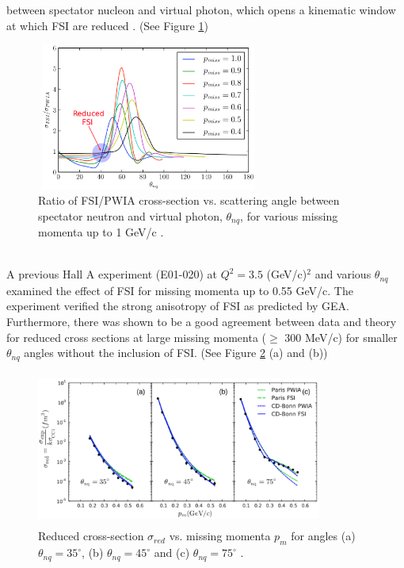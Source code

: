 \documentclass[8pt, twocolumn]{article}
\begin{document}
between spectator nucleon and virtual photon, which opens a kinematic window
at which FSI are reduced \cite{boeglin1}. (See Figure \ref{fig:Figure6})
 \begin{figure}[h]
  \centering
  \includegraphics[width=2.9in, height=1.9in]{FSI_ang_dist.eps}
  \caption{Ratio of FSI/PWIA cross-section vs. scattering angle between 
  spectator neutron and virtual photon, $\theta_{nq}$, for various missing momenta up to
  1 GeV/c \cite{boeglin1}.}
  \label{fig:Figure6}
\end{figure}\\
\indent A previous Hall A experiment (E01-020) \cite{ulmer} at $Q^{2}=3.5$ (GeV/c)$^{2}$ 
and various $\theta_{nq}$ examined the effect of FSI for missing momenta 
up to 0.55 GeV/c. The experiment verified the strong anisotropy of FSI 
as predicted by GEA. Furthermore, there was shown to be a good  
agreement between data and theory for reduced cross sections at 
large missing momenta ($\geq$ 300 MeV/c) for smaller $\theta_{nq}$ angles without the 
inclusion of FSI. (See Figure \ref{fig:Figure7} (a) and (b))   
\begin{figure}[h]
  \centering
  \includegraphics[width=3.7in, height=2.0in]{red_cross.pdf}
  \caption{Reduced cross-section $\sigma_{red}$ vs. missing momenta $p_{m}$ for angles (a) $\theta_{nq}=35^{\circ}$, (b) $\theta_{nq}=45^{\circ}$ and (c) $\theta_{nq}=75^{\circ}$ \cite{ulmer}.}
  \label{fig:Figure7}
\end{figure}
\vspace{-0.6cm}
\end{document}
